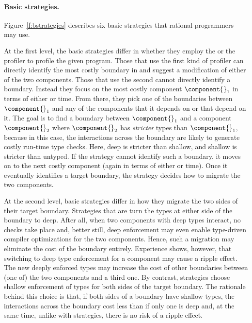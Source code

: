 \paragraph{Basic strategies.}  Figure~\ref{f:bstrategies} describes six basic
 strategies that rational programmers may use. 

At the first level, the basic strategies differ in whether they employ the
 \featkw{} or the \statkw{} profiler to profile the given program.  Those that
 use the first kind of profiler can directly identify the most costly boundary
 in \program{} and suggest a modification of either of the two components.
 Those that use the second cannot directly identify a boundary.  Instead they
 focus on the most costly component $\component{}_1$ in terms of either
 \selfkw{} or \totalkw{} time.  From there, they pick one of the boundaries
 between $\component{}_1$ and any of the components that it depends on or that
 depend on it. The goal is to find a boundary between $\component{}_1$ and a
 component $\component{}_2$ where $\component{}_2$ has \emph{stricter} types
 than $\component{}_1$, because in this case, the interactions across the
 boundary are likely to generate costly run-time type checks. Here, deep is
 stricter than shallow, and shallow is stricter than untyped. If the strategy
 cannot identify such a boundary, it moves on to the next costly component
 (again in terms of either \selfkw{} or \totalkw{} time). Once it eventually
 identifies a target boundary, the strategy decides how to migrate the
 two components.

At the second level, basic strategies differ in how they migrate the two sides
 of their target boundary. Strategies that are \optkw{} turn the types at either
 side of the boundary to deep. After all, when two components with deep types
 interact, no checks take place and, better still, deep enforcement may even
 enable type-driven compiler optimizations for the two components.  Hence, such
 a migration may eliminate the cost of the boundary entirely.  Experience shows,
 however, that switching to deep type enforcement for a component may cause a
 ripple effect. The new deeply enforced types may increase the cost of other
 boundaries between (one of) the two components and a third one. By contrast,
 \conkw{} strategies choose shallow enforcement of types for both sides of the
 target boundary. The rationale behind this choice is that, if both sides of a
 boundary have shallow types, the interactions across the boundary cost less
 than if only one is deep and, at the same time, unlike with \optkw{}
 strategies, there is no risk of a ripple effect.

